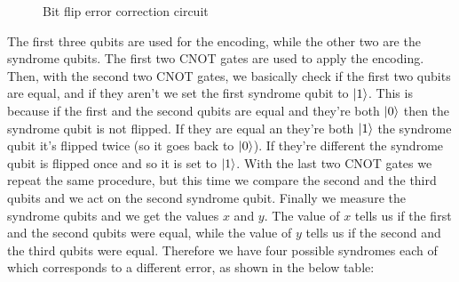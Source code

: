 \documentclass{article}
\begin{document}
	\begin{figure}[H]
	\centering
	\caption{Bit flip error correction circuit}
	\label{fig:bit-flip}
	\end{figure}
	\noindent The first three qubits are used for the encoding, while the other two are the syndrome qubits. The first two CNOT gates are used to apply the encoding. Then, with the second two CNOT gates, we basically check if the first two qubits are equal, and if they aren't we set the first syndrome qubit to $\ket{1}$. This is because if the first and the second qubits are equal and they're both $\ket{0}$ then the syndrome qubit is not flipped. If they are equal an they're both $\ket{1}$ the syndrome qubit it's flipped twice (so it goes back to $\ket{0}$). If they're different the syndrome qubit is flipped once and so it is set to $\ket{1}$. With the last two CNOT gates we repeat the same procedure, but this time we compare the second and the third qubits and we act on the second syndrome qubit. Finally we measure the syndrome qubits and we get the values $x$ and $y$. The value of $x$ tells us if the first and the second qubits were equal, while the value of $y$ tells us if the second and the third qubits were equal. Therefore we have four possible syndromes each of which corresponds to a different error, as shown in the below table:
\end{document}

